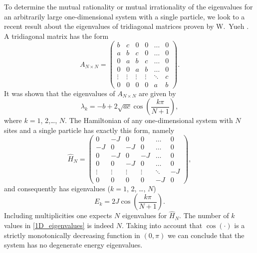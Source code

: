 \documentclass[a4paper, 10pt]{article}
\theoremstyle{plain}
\begin{document}
To determine the mutual rationality or mutual irrationality of the eigenvalues
for an arbitrarily large one-dimensional system with a single particle, we look
to a recent result about the eigenvalues of tridiagonal matrices proven by
W.~Yueh \cite{Yueh2006}. A tridiagonal matrix has the form
\begin{equation}
    A_{N \times N}
    =
    \begin{pmatrix}
             b &      c &     0  &      0 &  \dots & 0 \\
             a &      b &     c  &      0 &  \dots & 0 \\
             0 &      a &     b  &      c &  \dots & 0 \\
             0 &      0 &     a  &      b &  \dots & 0 \\
        \vdots & \vdots & \vdots & \vdots & \ddots & c \\
             0 &      0 &     0  &      0 &      a & b
    \end{pmatrix}.
\end{equation}
It was shown that the eigenvalues of $A_{N \times N}$ are given by
\begin{equation}
    \label{tridiagonal_eigenvalues_formula}
    \lambda_{k} = -b + 2 \sqrt{ac} \cos{\!\left( \frac{k \pi}{N+1} \right )},
\end{equation}
where $k=1$, 2,\dots, $N$. The Hamiltonian of any one-dimensional system with
$N$ sites and a single particle has exactly this form, namely
\begin{equation}
    \hat{H}_{N}
    =
    \begin{pmatrix}
         0 &     -J &     0  &      0 &  \dots &  0 \\
        -J &      0 &    -J  &      0 &  \dots &  0 \\
         0 &     -J &     0  &     -J &  \dots &  0 \\
         0 &      0 &    -J  &      0 &  \dots &  0 \\
    \vdots & \vdots & \vdots & \vdots & \ddots & -J \\
         0 &      0 &     0  &      0 &     -J &  0
    \end{pmatrix},
\end{equation}
and consequently has eigenvalues ($k=1$, 2, \dots, $N$)
\begin{equation}
    \label{1D_eigenvalues}
    E_{k} = 2 J \cos{\!\left( \frac{k \pi}{N+1} \right)}.
\end{equation}
Including multiplicities one expects $N$ eigenvalues for $\hat{H}_{N}$. The
number of $k$ values in \eqref{1D_eigenvalues} is indeed $N$. Taking into
account that $\cos{\!(\cdot)}$ is a strictly monotonically decreasing function
in $(0, \pi)$ we can conclude that the system has no degenerate energy
eigenvalues.
\end{document}
